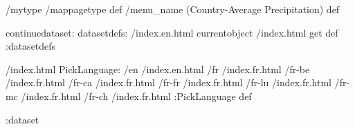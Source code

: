 \begin{ingrid}
/mytype /mappagetype def
/menu_name (Country-Average Precipitation) def

continuedataset:
datasetdefs:
/index.en.html currentobject /index.html get def
:datasetdefs

/index.html {
PickLanguage:
/en /index.en.html
/fr /index.fr.html
/fr-be /index.fr.html
/fr-ca /index.fr.html
/fr-fr /index.fr.html
/fr-lu /index.fr.html
/fr-mc /index.fr.html
/fr-ch /index.fr.html
:PickLanguage
} def

:dataset

\end{ingrid}
